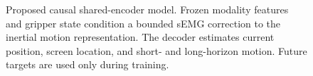 \begin{figure}[t]
    \centering
    
    \caption{Proposed causal shared-encoder model. Frozen modality features and
    gripper state condition a bounded sEMG correction to the inertial motion
    representation. The decoder estimates current position, screen location,
    and short- and long-horizon motion. Future targets are used only during
    training.}
    \label{fig:final-neuromuscular-model}
\end{figure}
